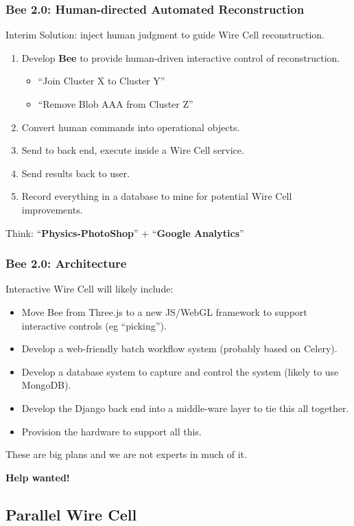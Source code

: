 \documentclass[xcolor=dvipsnames]{beamer}
\begin{document}
\begin{frame}
  \frametitle{Bee 2.0: Human-directed Automated Reconstruction}
  Interim Solution: inject human judgment to guide Wire Cell reconstruction.
  \begin{enumerate}
  \item Develop \textbf{Bee} to provide human-driven interactive control of reconstruction.
    \begin{itemize}
    \item ``Join Cluster X to Cluster Y''
    \item ``Remove Blob AAA from Cluster Z''
    \end{itemize}
  \item Convert human commands into operational objects.
  \item Send to back end, execute inside a Wire Cell service.
  \item Send results back to user.
  \item Record everything in a database to mine for potential Wire
    Cell improvements.
  \end{enumerate}
  Think: ``\textbf{Physics-PhotoShop}'' + ``\textbf{Google Analytics}''
\end{frame}

\begin{frame}
  \frametitle{Bee 2.0: Architecture}
  Interactive Wire Cell will likely include:
  \begin{itemize}
  \item Move Bee from Three.js to a new JS/WebGL framework to support interactive controls (eg ``picking'').
  \item Develop a web-friendly batch workflow system (probably based on Celery).
  \item Develop a database system to capture and control the system (likely to use MongoDB).
  \item Develop the Django back end into a middle-ware layer to tie this all together.
  \item Provision the hardware to support all this.
  \end{itemize}

  These are big plans and we are not experts in much of it.  

  \textbf{Help wanted!}

\end{frame}

\subsection{Parallel Wire Cell}
\end{document}
